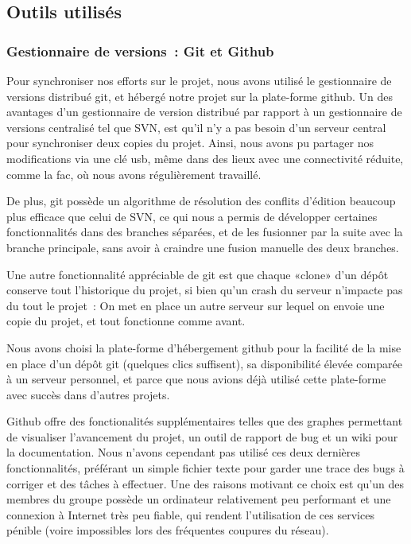 \documentclass[a4paper,11pt,french]{article}
\begin{document}
\subsection{Outils utilisés}
\subsubsection{Gestionnaire de versions~: Git et Github}


Pour synchroniser nos efforts sur le projet, nous avons utilisé le gestionnaire de versions distribué git, et hébergé notre projet sur la
plate-forme github. Un des avantages d'un gestionnaire de version distribué par rapport à un gestionnaire de versions centralisé tel que
SVN, est qu'il n'y a pas besoin d'un serveur central pour synchroniser deux copies du projet. Ainsi, nous avons pu partager nos
modifications via une clé usb, même dans des lieux avec une connectivité réduite, comme la fac, où nous avons régulièrement travaillé.

De plus, git possède un algorithme de résolution des conflits d'édition beaucoup plus efficace que celui de SVN, ce qui nous a permis de
développer certaines fonctionnalités dans des branches séparées, et de les fusionner par la suite avec la branche principale, sans avoir à
craindre une fusion manuelle des deux branches.

Une autre fonctionnalité appréciable de git est que chaque «clone» d'un dépôt conserve tout l'historique du projet, si bien qu'un crash du
serveur n'impacte pas du tout le projet~: On met en place un autre serveur sur lequel on envoie une copie du projet, et tout fonctionne
comme avant.

Nous avons choisi la plate-forme d'hébergement github pour la facilité de la mise en place d'un dépôt git (quelques clics suffisent), sa
disponibilité élevée comparée à un serveur personnel, et parce que nous avions déjà utilisé cette plate-forme avec succès dans d'autres
projets.

Github offre des fonctionalités supplémentaires telles que des graphes permettant de visualiser l'avancement du projet, un outil de rapport
de bug et un wiki pour la documentation. Nous n'avons cependant pas utilisé ces deux dernières fonctionnalités, préférant un simple fichier
texte pour garder une trace des bugs à corriger et des tâches à effectuer. Une des raisons motivant ce choix est qu'un des membres du groupe
possède un ordinateur relativement peu performant et une connexion à Internet très peu fiable, qui rendent l'utilisation de ces services
pénible (voire impossibles lors des fréquentes coupures du réseau).
\end{document}
